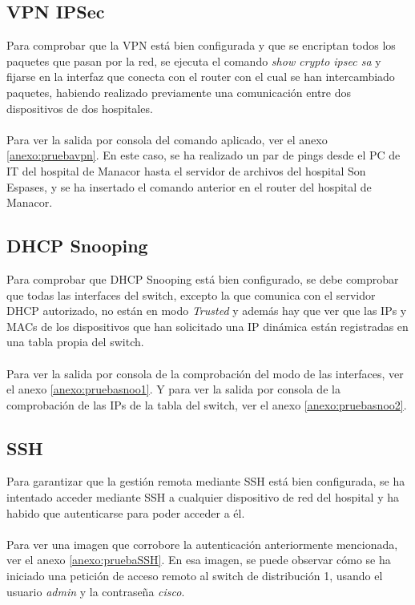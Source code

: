 \subsection{VPN IPSec}
Para comprobar que la VPN está bien configurada y que se encriptan todos los paquetes que pasan por la red, se ejecuta el comando \textit{show crypto ipsec sa} y fijarse en la interfaz que 
conecta con el router con el cual se han intercambiado paquetes, habiendo realizado previamente una comunicación entre dos dispositivos de dos hospitales.
\\ \\ 
Para ver la salida por consola del comando aplicado, ver el anexo \ref{anexo:pruebavpn}. En este caso, se ha realizado un par de pings desde el PC de IT del hospital de Manacor hasta el 
servidor de archivos del hospital Son Espases, y se ha insertado el comando anterior en el router del hospital de Manacor.

\subsection{DHCP Snooping}
Para comprobar que DHCP Snooping está bien configurado, se debe comprobar que todas las interfaces del switch, excepto la que comunica con el servidor DHCP autorizado, no están en modo 
\textit{Trusted} y además hay que ver que las IPs y MACs de los dispositivos que han solicitado una IP dinámica están registradas en una tabla propia del switch.
\\ \\ 
Para ver la salida por consola de la comprobación del modo de las interfaces, ver el anexo \ref{anexo:pruebasnoo1}. Y para ver la salida por consola de la comprobación de las IPs de la tabla del switch, ver el anexo \ref{anexo:pruebasnoo2}.

\subsection{SSH}
Para garantizar que la gestión remota mediante SSH está bien configurada, se ha intentado acceder mediante SSH a cualquier dispositivo de red del hospital y ha habido que autenticarse para poder acceder a él.
\\ \\ 
Para ver una imagen que corrobore la autenticación anteriormente mencionada, ver el anexo \ref{anexo:pruebaSSH}. En esa imagen, se puede observar cómo se ha iniciado una petición de acceso remoto al switch de distribución 1, usando el usuario \textit{admin} y la contraseña \textit{cisco}.

